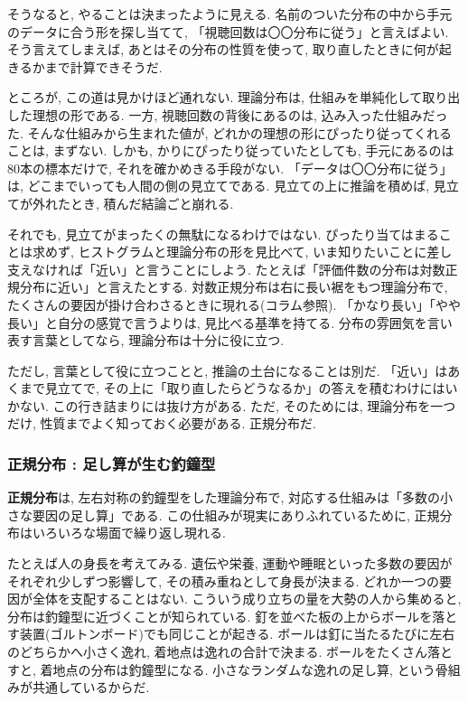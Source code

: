     そうなると, やることは決まったように見える.
    名前のついた分布の中から手元のデータに合う形を探し当てて, 「視聴回数は〇〇分布に従う」と言えばよい.
    そう言えてしまえば, あとはその分布の性質を使って, 取り直したときに何が起きるかまで計算できそうだ.

    ところが, この道は見かけほど通れない.
    理論分布は, 仕組みを単純化して取り出した理想の形である.
    一方, 視聴回数の背後にあるのは, 込み入った仕組みだった.
    そんな仕組みから生まれた値が, どれかの理想の形にぴったり従ってくれることは, まずない.
    しかも, かりにぴったり従っていたとしても, 手元にあるのは80本の標本だけで, それを確かめきる手段がない.
    「データは〇〇分布に従う」は, どこまでいっても人間の側の見立てである.
    見立ての上に推論を積めば, 見立てが外れたとき, 積んだ結論ごと崩れる.

    それでも, 見立てがまったくの無駄になるわけではない.
    ぴったり当てはまることは求めず, ヒストグラムと理論分布の形を見比べて, いま知りたいことに差し支えなければ「近い」と言うことにしよう.
    たとえば「評価件数の分布は対数正規分布に近い」と言えたとする.
    対数正規分布は右に長い裾をもつ理論分布で, たくさんの要因が掛け合わさるときに現れる(コラム参照).
    「かなり長い」「やや長い」と自分の感覚で言うよりは, 見比べる基準を持てる.
    分布の雰囲気を言い表す言葉としてなら, 理論分布は十分に役に立つ.

    ただし, 言葉として役に立つことと, 推論の土台になることは別だ.
    「近い」はあくまで見立てで, その上に「取り直したらどうなるか」の答えを積むわけにはいかない.
    この行き詰まりには抜け方がある.
    ただ, そのためには, 理論分布を一つだけ, 性質までよく知っておく必要がある.
    正規分布だ.

    \subsubsection*{正規分布 : 足し算が生む釣鐘型}

    \textbf{正規分布}は, 左右対称の釣鐘型をした理論分布で, 対応する仕組みは「多数の小さな要因の足し算」である.
    この仕組みが現実にありふれているために, 正規分布はいろいろな場面で繰り返し現れる.

    たとえば人の身長を考えてみる.
    遺伝や栄養, 運動や睡眠といった多数の要因がそれぞれ少しずつ影響して, その積み重ねとして身長が決まる.
    どれか一つの要因が全体を支配することはない.
    こういう成り立ちの量を大勢の人から集めると, 分布は釣鐘型に近づくことが知られている.
    釘を並べた板の上からボールを落とす装置(ゴルトンボード)でも同じことが起きる.
    ボールは釘に当たるたびに左右のどちらかへ小さく逸れ, 着地点は逸れの合計で決まる.
    ボールをたくさん落とすと, 着地点の分布は釣鐘型になる.
    小さなランダムな逸れの足し算, という骨組みが共通しているからだ.

